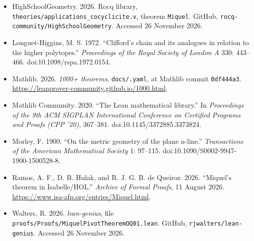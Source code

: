 \documentclass[11pt]{article}
\theoremstyle{definition}
\theoremstyle{remark}
\begin{document}
\begin{itemize}
  doi:10.1007/978-3-030-79876-5\_37.
\item
  HighSchoolGeometry. 2026. Rocq library, \texttt{theories/\allowbreak applications\_\allowbreak cocyclicite.\allowbreak v}, theorem \texttt{Miquel}. GitHub,
  \texttt{rocq-community/\allowbreak HighSchoolGeometry}. Accessed 26 November 2026.
\item
  Longuet-Higgins, M. S. 1972. ``Clifford's chain and its analogues in relation to the higher polytopes.''
  \emph{Proceedings of the Royal Society of London A} 330: 443--466. doi:10.1098/rspa.1972.0154.
\item
  Mathlib. 2026. \emph{1000+ theorems}, \texttt{docs/.\allowbreak yaml}, at Mathlib commit \texttt{0df444a3}.
  \url{https://leanprover-community.github.io/1000.html}.
\item
  Mathlib Community. 2020. ``The Lean mathematical library.'' In \emph{Proceedings of the 9th ACM SIGPLAN
  International Conference on Certified Programs and Proofs (CPP '20)}, 367--381.
  doi:10.1145/3372885.3373824.
\item
  Morley, F. 1900. ``On the metric geometry of the plane n-line.'' \emph{Transactions of the American
  Mathematical Society} 1: 97--115. doi:10.1090/S0002-9947-1900-1500528-8.
\item
  Ramos, A. F., D. B. Hulak, and R. J. G. B. de Queiroz. 2026. ``Miquel's theorem in Isabelle/HOL.''
  \emph{Archive of Formal Proofs}, 11 August 2026. \url{https://www.isa-afp.org/entries/Miquel.html}.
\item
  Walters, R. 2026. \emph{lean-genius}, file \texttt{proofs/\allowbreak Proofs/\allowbreak MiquelPivotTheoremOQ01.\allowbreak lean}. GitHub,
  \texttt{rjwalters/\allowbreak lean-genius}. Accessed 26 November 2026.
\end{itemize}
\end{document}
